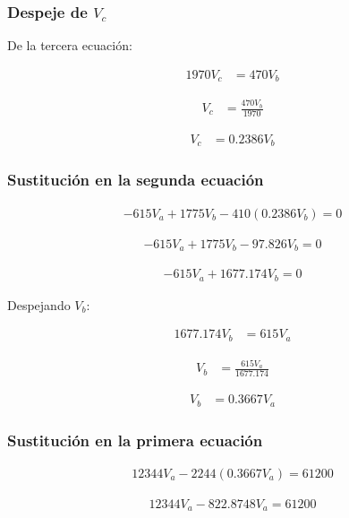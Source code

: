 \documentclass[conference]{IEEEtran}
\begin{document}
\subsubsection{Despeje de $V_c$}

De la tercera ecuación:

\begin{align*}
1970V_c&=470V_b
\end{align*}

\begin{align*}
V_c&=\frac{470V_b}{1970}
\end{align*}

\begin{align*}
V_c&=0.2386V_b
\end{align*}

\subsubsection{Sustitución en la segunda ecuación}

\begin{align*}
-615V_a+1775V_b-410(0.2386V_b)=0
\end{align*}

\begin{align*}
-615V_a+1775V_b-97.826V_b=0
\end{align*}

\begin{align*}
-615V_a+1677.174V_b=0
\end{align*}

Despejando $V_b$:

\begin{align*}
1677.174V_b&=615V_a
\end{align*}

\begin{align*}
V_b&=\frac{615V_a}{1677.174}
\end{align*}

\begin{align*}
V_b&=0.3667V_a
\end{align*}

\subsubsection{Sustitución en la primera ecuación}

\begin{align*}
12344V_a-2244(0.3667V_a)=61200
\end{align*}

\begin{align*}
12344V_a-822.8748V_a=61200
\end{align*}
\end{document}
